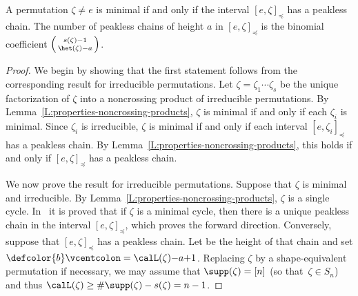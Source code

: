 \begin{proposition}\label{P:peaklessChains}
 A permutation $\zeta\ne e$ is minimal if and only if the interval $[e,\zeta]_\preceq$ has a peakless chain.
 The number of peakless chains of height $a$ in $[e,\zeta]_\preceq$ is the binomial coefficient
 $\left(\begin{smallmatrix} s(\zeta)-1 \\ \het(\zeta)-a \end{smallmatrix}\right)$.
\end{proposition}

\begin{proof}
    We begin by showing that the first statement follows from the corresponding
    result for irreducible permutations.
    Let $\zeta=\zeta_1\dotsb \zeta_s$ be the unique
    factorization of $\zeta$ into a noncrossing product of irreducible permutations.
    By Lemma~\ref{L:properties-noncrossing-products},
    $\zeta$ is minimal if and only if each $\zeta_i$ is minimal.
    Since $\zeta_i$ is irreducible,
    $\zeta$ is minimal if and only if each interval $[e, \zeta_i]_{\preceq}$ has
    a peakless chain.
    By Lemma~\ref{L:properties-noncrossing-products},
    this holds if and only if $[e, \zeta]_{\preceq}$ has a peakless chain.

We now prove the result for irreducible permutations.
Suppose that $\zeta$ is minimal and irreducible.
By Lemma~\ref{L:properties-noncrossing-products}, $\zeta$ is a single cycle.
In~\cite[Lem.~6.7]{BS-iso} it is proved that if $\zeta$ is a minimal cycle,
then there is a unique peakless chain in the interval $[e, \zeta]_\preceq$,
which proves the forward direction.
Conversely, suppose that $[e, \zeta]_\preceq$ has a peakless chain.
Let  be the height of that chain and set
$\defcolor{b}\vcentcolon=\calL(\zeta){-}a{+}1$.
Replacing $\zeta$ by a shape-equivalent permutation if necessary, we may assume
that $\supp(\zeta)=[n]$ (so that~$\zeta\in S_n$) and thus $\calL(\zeta) \geq
\#\supp(\zeta) - s(\zeta) = n-1$.


\end{proof}
